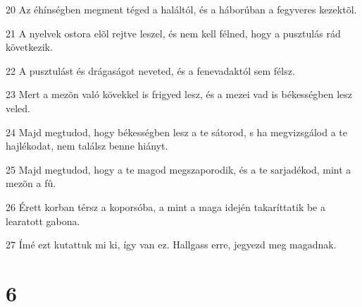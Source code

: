 \par 20 Az éhínségben megment téged a haláltól, és a háborúban a fegyveres kezektõl.
\par 21 A nyelvek ostora elõl rejtve leszel, és nem kell félned, hogy a pusztulás rád következik.
\par 22 A pusztulást és drágaságot neveted, és a fenevadaktól  sem félsz.
\par 23 Mert a mezõn való kövekkel is frigyed lesz, és a mezei vad is békességben lesz veled.
\par 24 Majd megtudod, hogy békességben lesz a te sátorod, s ha megvizsgálod a te hajlékodat, nem találsz benne hiányt.
\par 25 Majd megtudod, hogy a te magod megszaporodik, és a te sarjadékod, mint a mezõn a fû.
\par 26 Érett korban térsz a koporsóba, a mint a maga idején takaríttatik be a learatott gabona.
\par 27 Ímé ezt kutattuk mi ki, így van ez. Hallgass erre, jegyezd meg magadnak.

\chapter{6}


